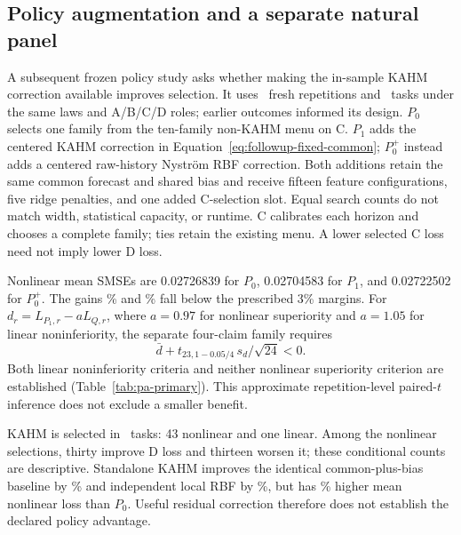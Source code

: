 \subsection{Policy augmentation and a separate natural panel}
\label{sec:policy-augmentation}

A subsequent frozen policy study asks whether making the in-sample KAHM
correction available improves selection. It uses \PARepetitions\ fresh
repetitions and \PATasks\ tasks under the same laws and A/B/C/D roles;
earlier outcomes informed its design. $P_0$ selects one family from the
ten-family non-KAHM menu on C. $P_1$ adds the centered KAHM correction
in Equation~\eqref{eq:followup-fixed-common}; $P_0^+$ instead adds a
centered raw-history Nystr\"om RBF correction. Both additions retain the
same common forecast and shared bias and receive fifteen feature
configurations, five ridge penalties, and one added C-selection slot.
Equal search counts do not match width, statistical capacity, or runtime.
C calibrates each horizon and chooses a complete family; ties retain
the existing menu. A lower selected C loss need not imply lower D loss.

Nonlinear mean SMSEs are 0.02726839 for $P_0$, 0.02704583 for $P_1$,
and 0.02722502 for $P_0^+$. The gains \PAGainPZero\% and
\PAGainExtra\% fall below the prescribed 3\% margins. For
$d_r=L_{P_1,r}-aL_{Q,r}$, where $a=0.97$ for nonlinear superiority
and $a=1.05$ for linear noninferiority, the separate four-claim family
requires
\begin{equation}
 \bar d+t_{23,1-0.05/4}\,s_d/\sqrt{24}<0.
 \label{eq:pa-primary-bound}
\end{equation}
Both linear noninferiority criteria and neither nonlinear superiority
criterion are established (Table~\ref{tab:pa-primary}). This approximate
repetition-level paired-$t$ inference does not exclude a smaller benefit.

\begin{table}[t]
\centering\small
\caption{The preceding policy study's four original criteria, preserved
separately from the representation ablation. Gain is
$100(1-\overline L_{P_1}/\overline L_Q)$; the adjusted upper endpoint
concerns the absolute margin contrast in
Equation~\eqref{eq:pa-primary-bound}. A negative endpoint establishes
the criterion.}
\label{tab:pa-primary}

\end{table}

KAHM is selected in \PASyntheticSelections\ tasks: 43 nonlinear and
one linear. Among the nonlinear selections, thirty improve D loss and
thirteen worsen it; these conditional counts are descriptive. Standalone
KAHM improves the identical common-plus-bias baseline by
\PAMechanismBiasGain\% and independent local RBF by
\PAMechanismRBFGain\%, but has \PAStandalonePolicyPenalty\% higher
mean nonlinear loss than $P_0$. Useful residual correction therefore does
not establish the declared policy advantage.

